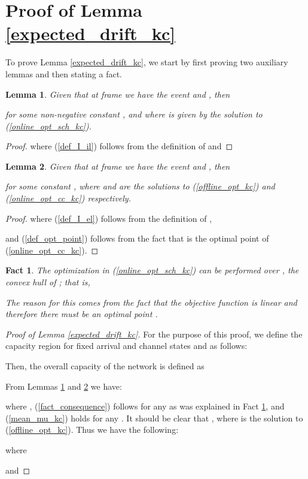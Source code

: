 \documentclass[conference]{IEEEtran}
\newtheorem{lemma}{Lemma}
\newtheorem{fact}{Fact}
\begin{document}
\appendices
\section{Proof of Lemma \ref{expected_drift_kc}}

To prove Lemma \ref{expected_drift_kc}, we start by first proving two auxiliary lemmas and then stating a fact.

\begin{lemma}
\label{bound_d_kc}
Given that at frame  we have the event  and , then

for some non-negative constant , and where  is given by the solution to (\ref{online_opt_sch_kc}).

\end{lemma}

\begin{proof}

where (\ref{def_I_il}) follows from the definition of  and

\end{proof}

\begin{lemma}
\label{bound_q_kc}
Given that at frame  we have the event  and , then

for some constant , where  and  are the solutions to (\ref{offline_opt_kc}) and (\ref{online_opt_cc_kc}) respectively.

\end{lemma}

\begin{proof}

where (\ref{def_I_el}) follows from the definition of ,

and (\ref{def_opt_point}) follows from the fact that  is the optimal point of (\ref{online_opt_cc_kc}).
\end{proof}

\begin{fact}
\label{fact_online_opt_kc}
The optimization in (\ref{online_opt_sch_kc}) can be performed over , the convex hull of ; that is,

The reason for this comes from the fact that the objective function is linear and therefore there must be an optimal point .

\end{fact}

\begin{proof}[Proof of Lemma \ref{expected_drift_kc}]
For the purpose of this proof, we define the capacity region for fixed arrival and channel states  and  as follows:

Then, the overall capacity of the network is defined as



From Lemmas \ref{bound_d_kc} and \ref{bound_q_kc} we have:

where , (\ref{fact_consequence}) follows for any  as was explained in Fact \ref{fact_online_opt_kc}, and (\ref{mean_mu_kc}) holds for any . It should be clear that , where  is the solution to (\ref{offline_opt_kc}). Thus we have the following:

where

and

\end{proof}
\end{document}
